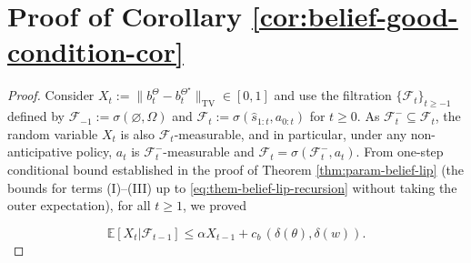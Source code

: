 \documentclass[10pt]{article} %
\theoremstyle{plain}
\theoremstyle{definition}
\theoremstyle{remark}
\newcommand{\bE}{\mathbb{E}}
\newcommand{\cF}{\mathcal{F}}
\begin{document}





 

\section{Proof of Corollary \ref{cor:belief-good-condition-cor}}
\begin{proof}\label{proof:col-belief}
Consider $X_t:=\|b_t^\Theta-b_t^{\Theta^\star}\|_{\mathrm{TV}}\in[0,1]$ and use the filtration
$\{\mathcal F_t\}_{t\ge -1}$ defined by $\mathcal F_{-1}:=\sigma(\varnothing,\Omega)$ and
$\mathcal F_t:=\sigma(\hat s_{1:t},a_{0:t})$ for $t\ge 0$. As $\mathcal F_t^- \subseteq \mathcal F_t$, the random variable $X_t$ is also $\mathcal F_t$-measurable, and in particular, under any non-anticipative policy, $a_t$ is $\mathcal F_t^-$-measurable and
$\mathcal F_t=\sigma(\mathcal F_t^-,a_t)$. From one-step conditional bound established in the proof of Theorem \ref{thm:param-belief-lip}
(the bounds for terms (I)--(III) up to \ref{eq:them-belief-lip-recursion} without taking the outer expectation), for all $t\ge 1$, we proved

\begin{equation}\label{eq:belief-freedman-drift-bound}
\bE[X_t|\cF_{t-1}]\le\alpha X_{t-1} +c_b\,(\delta(\theta),\delta(w)).
\end{equation}
 

\end{proof}
\end{document}
